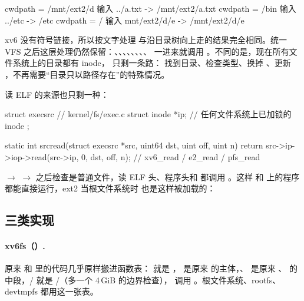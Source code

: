 \begin{txtcode}
cwdpath = /mnt/ext2/d      输入 ../a.txt     ->  /mnt/ext2/a.txt
cwdpath = /bin             输入 ../etc       ->  /etc
cwdpath = /                输入 mnt/ext2/d/e ->  /mnt/ext2/d/e
\end{txtcode}

xv6 没有符号链接，所以按文字处理  与沿目录树向上走的结果完全相同。统一 VFS 之后这层处理仍然保留：、、、、、、、、 一进来就调用 。不同的是，现在所有文件系统上的目录都有 inode， 只剩一条路： 找到目录、检查类型、换掉 、更新 ，不再需要“目录只以路径存在”的特殊情况。

 读 ELF 的来源也只剩一种：

\begin{ccode}
struct execsrc {                 // kernel/fs/exec.c
  struct inode *ip;              // 任何文件系统上已加锁的 inode
};

static int srcread(struct execsrc *src, uint64 dst, uint off, uint n) {
  return src->ip->iop->read(src->ip, 0, dst, off, n);   // xv6_read / e2_read / pfs_read
}
\end{ccode}

 $\to$  $\to$  之后检查是普通文件，读 ELF 头、程序头和  都调用 。这样  和  上的程序都能直接运行，ext2 当根文件系统时  也是这样被加载的：


\subsection{三类实现}

\paragraph{xv6fs（）.} 原来  和  里的代码几乎原样搬进函数表： 就是 ， 是原来  的主体，、 是原来 、 的中段，/ 就是 /（多一个 4\,GiB 的边界检查）， 调用 。根文件系统、rootfs、devtmpfs 都用这一张表。

